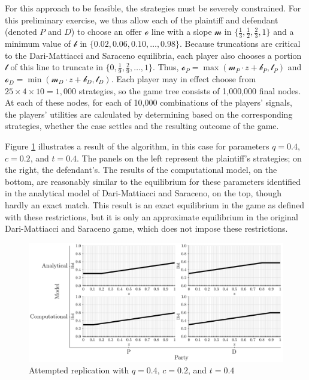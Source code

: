 \documentclass{article}
\begin{document}
For this approach to be feasible, the strategies must be severely constrained. For this preliminary exercise, we thus allow each of the plaintiff and defendant (denoted $P$ and $D$) to choose an offer $\mathcal{o}$ line with a slope $\mathcal{m}$ in $\{ \frac{1}{3}, \frac{1}{2}, \frac{2}{3}, 1 \}$ and a minimum value of $\mathcal{b}$ in $\{0.02, 0.06, 0.10, \ldots, 0.98\}$. Because truncations are critical to the Dari-Mattiacci and Saraceno equilibria, each player also chooses a portion $\mathcal{t}$ of this line to truncate in $\{0, \frac{1}{9}, \frac{2}{9}, \ldots, 1\}$. Thus, $\mathcal{o}_P = \max(\mathcal{m}_P \cdot z + \mathcal{b}_P , \mathcal{t}_P)$  and $\mathcal{o}_D = \min(\mathcal{m}_D \cdot z + \mathcal{b}_D , \mathcal{t}_D)$. Each player may in effect choose from $25 \times 4 \times 10 = 1,000$ strategies, so the game tree consists of 1,000,000 final nodes. At each of these nodes, for each of 10,000 combinations of the players' signals, the players' utilities are calculated by determining based on the corresponding strategies, whether the case settles and the resulting outcome of the game. 

Figure \ref{fig:replication1} illustrates a result of the algorithm, in this case for parameters $q = 0.4$, $c = 0.2$, and $t = 0.4$. The panels on the left represent the plaintiff's strategies; on the right, the defendant's. The results of the computational model, on the bottom, are reasonably similar to the equilibrium for these parameters identified in the analytical model of Dari-Mattiacci and Saraceno, on the top, though hardly an exact match. This result is an exact equilibrium in the game as defined with these restrictions, but it is only an approximate equilibrium in the original Dari-Mattiacci and Saraceno game, which does not impose these restrictions. 

\begin{figure}[h!]
\centering
\includegraphics[scale=0.52, trim={0in 0in 0in 0in}, clip]{../Figures/replication1.pdf}
\caption{Attempted replication with $q = 0.4$, $c = 0.2$, and $t = 0.4$}
\label{fig:replication1}
\end{figure}
\end{document}
